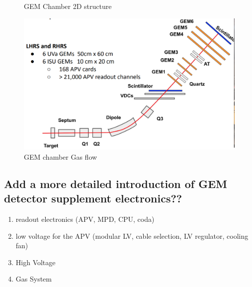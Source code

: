 \begin{figure}[!htbp]
\begin{minipage}[b]{0.45\textwidth}
    \caption{GEM Chamber 2D structure}
  \end{minipage}
  \hfill
  \begin{minipage}[b]{0.45\textwidth}
    \includegraphics[width=\textwidth]{images/chap5/gem_apparatus_in_hrs_2d.png}
    \caption{GEM chamber Gas flow}
  \end{minipage}
\end{figure}


\subsection{Add a more detailed introduction of GEM detector supplement electronics??}
\begin{enumerate}
    \item readout electronics (APV, MPD, CPU, coda)
    \item low voltage for the APV (modular LV, cable selection, LV regulator, cooling fan) 
    \item High Voltage
    \item Gas System
\end{enumerate}


